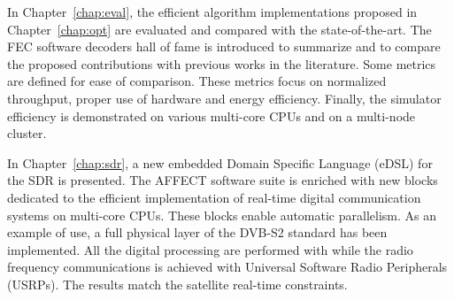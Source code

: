 In Chapter~\ref{chap:eval}, the efficient algorithm implementations proposed
in Chapter~\ref{chap:opt} are evaluated and compared with the state-of-the-art.
The FEC software decoders hall of fame is introduced to summarize and to compare
the proposed contributions with previous works in the literature. Some metrics
are defined for ease of comparison. These metrics focus on normalized
throughput, proper use of hardware and energy efficiency. Finally, the \AFFECT
simulator efficiency is demonstrated on various multi-core CPUs and on a
multi-node cluster.

In Chapter~\ref{chap:sdr}, a new embedded Domain Specific Language (eDSL) for
the SDR is presented. The AFFECT software suite is enriched with new blocks
dedicated to the efficient implementation of real-time digital communication
systems on multi-core CPUs. These blocks enable automatic parallelism. As an
example of use, a full physical layer of the DVB-S2 standard has been
implemented. All the digital processing are performed with \AFFECT while the
radio frequency communications is achieved with Universal Software Radio
Peripherals (USRPs). The results match the satellite real-time constraints.
